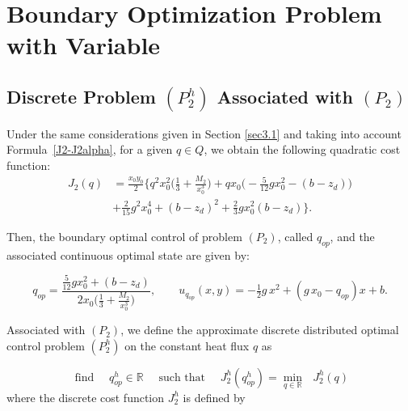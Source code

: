 \documentclass[11pt]{article}
\begin{document}
\section{Boundary Optimization Problem with Variable }\label{sec4}%

\subsection{Discrete Problem  ${(P^h_2)}$ Associated with $(P_2)$} %

Under the same considerations given in Section \ref{sec3.1} and taking into account Formula~\eqref{J2-J2alpha}, for a given $q \in Q$, we obtain the following quadratic cost function:
        \begin{equation}\label{J2}
        \begin{array}{ll}
        J_2(q)&=\tfrac{x_0 y_0}{2}\Big\{ q^2 x_0^2 \Big(\tfrac{1}{3} +\tfrac{M_2}{x_0^3}\Big)+q x_0 \Big(-\tfrac{5}{12} g x_0^2-  (b-z_d)\Big)  \\[0.5cm]
       &+\tfrac{2}{15} g^2 x_0^4 +  (b-z_d)^2+\tfrac{2}{3} g x_0^2 (b-z_d) \Big\}.
\end{array}       
       \end{equation}

  \noindent Then, the boundary optimal control of problem $(P_2)$, called $q_{op}$, and the associated continuous optimal state
  are given by:
 
      \begin{equation}\label{ec 4.2}
          q_{op}=\frac{\tfrac{5}{12} g x_0^2+ (b-z_d)}{2 x_0 \big(\tfrac{1}{3}+\tfrac{M_2}{x_0^3}\big)},\qquad u_{q_{op}}(x,y) = -\tfrac{1}{2} g\, x^2 + (g\, x_0 - q_{op}) x +b.
       \end{equation}

      

Associated with $(P_2)$, we define  the approximate discrete distributed optimal control problem ${(P^h_2)}$ on the constant heat flux $q$ as

$$ \text{ find }\quad {q^h_{op}}\in \mathbb{R}\quad\text{ such that }\quad
{J^h_2}({q^h_{op}})=\min\limits_{q\in \mathbb{R}} \text{ }{J^h_2}(q)
$$
where the  discrete cost function ${J^h_2}$ is defined by
    
\end{document}
